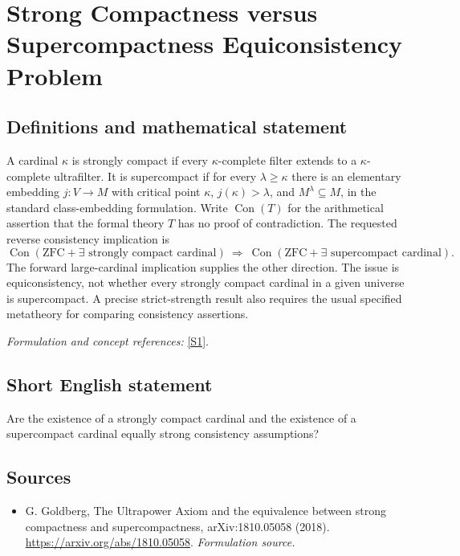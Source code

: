 \documentclass[11pt]{article}
\begin{document}
\section*{\texorpdfstring{Strong Compactness versus Supercompactness Equiconsistency Problem}{Strong Compactness versus Supercompactness Equiconsistency Problem}}\label{361}
\subsection{Definitions and mathematical statement}
A cardinal $\kappa$ is strongly compact if every $\kappa$-complete filter extends to a $\kappa$-complete ultrafilter. It is supercompact if for every $\lambda\ge\kappa$ there is an elementary embedding $j:V\to M$ with critical point $\kappa$, $j(\kappa)>\lambda$, and $M^\lambda\subseteq M$, in the standard class-embedding formulation. Write $\operatorname{Con}(T)$ for the arithmetical assertion that the formal theory $T$ has no proof of contradiction. The requested reverse consistency implication is
\[
 \operatorname{Con}(\mathrm{ZFC}+\exists\text{ strongly compact cardinal})
 \ \Longrightarrow\
 \operatorname{Con}(\mathrm{ZFC}+\exists\text{ supercompact cardinal}).
\]
The forward large-cardinal implication supplies the other direction. The issue is equiconsistency, not whether every strongly compact cardinal in a given universe is supercompact. A precise strict-strength result also requires the usual specified metatheory for comparing consistency assertions.
\par\smallskip\textit{Formulation and concept references:} \href{https://arxiv.org/abs/1810.05058}{[S1]}.

\subsection{Short English statement}
Are the existence of a strongly compact cardinal and the existence of a supercompact cardinal equally strong consistency assumptions?
\subsection{Sources}
\begin{itemize}
\item[S1]G. Goldberg, The Ultrapower Axiom and the equivalence between strong compactness and supercompactness, arXiv:1810.05058 (2018).
\url{https://arxiv.org/abs/1810.05058}.
\textit{Formulation source.}
\end{itemize}
\end{document}

